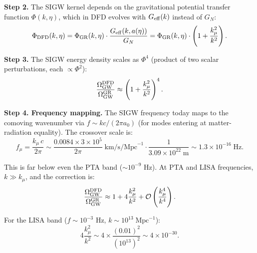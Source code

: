\documentclass[11pt]{article}
\newcommand{\ee}[1]{\times 10^{#1}}
\newcommand{\Geff}{G_{\rm eff}}
\newcommand{\kmu}{k_\mu}
\begin{document}
\textbf{Step 2.} The SIGW kernel depends on the gravitational
potential transfer function $\Phi(k,\eta)$, which in DFD evolves
with $\Geff(k)$ instead of $G_N$:
\begin{equation}
\Phi_{\rm DFD}(k,\eta) = \Phi_{\rm GR}(k,\eta) \cdot
\frac{\Geff(k,a(\eta))}{G_N}
= \Phi_{\rm GR}(k,\eta) \cdot \left(1 + \frac{\kmu^2}{k^2}\right).
\end{equation}

\textbf{Step 3.} The SIGW energy density scales as $\Phi^4$
(product of two scalar perturbations, each $\propto \Phi^2$):
\begin{equation}
\frac{\Omega_{\rm GW}^{\rm DFD}}{\Omega_{\rm GW}^{\rm GR}} \approx
\left(1 + \frac{\kmu^2}{k^2}\right)^4.
\end{equation}

\textbf{Step 4. Frequency mapping.} The SIGW frequency today maps
to the comoving wavenumber via $f \sim k c/(2\pi a_0)$ (for modes
entering at matter-radiation equality). The crossover scale is:
\begin{equation}
f_\mu = \frac{\kmu\,c}{2\pi} \sim \frac{0.0084 \times 3\ee{5}}{2\pi}
\;\text{km/s/Mpc}^{-1} \cdot \frac{1}{3.09\ee{22}\;\text{m}}
\sim 1.3\ee{-16}\;\text{Hz}.
\end{equation}

This is far below even the PTA band ($\sim 10^{-9}$ Hz). At PTA
and LISA frequencies, $k \gg \kmu$, and the correction is:
\begin{equation}
\frac{\Omega_{\rm GW}^{\rm DFD}}{\Omega_{\rm GW}^{\rm GR}}
\approx 1 + 4\frac{\kmu^2}{k^2} + \mathcal{O}\left(\frac{\kmu^4}{k^4}\right).
\end{equation}

For the LISA band ($f \sim 10^{-3}$ Hz, $k \sim 10^{13}\;\text{Mpc}^{-1}$):
\begin{equation}
4\frac{\kmu^2}{k^2} \sim 4 \times \frac{(0.01)^2}{(10^{13})^2}
\sim 4\ee{-30}.
\end{equation}
\end{document}
